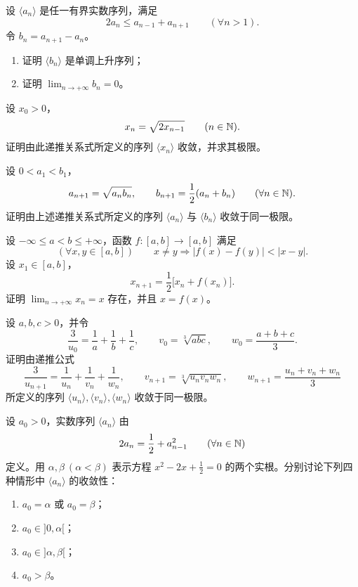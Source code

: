 \begin{exercise}
\item 设 \(\langle a_n\rangle\) 是任一有界实数序列，满足
\[
2a_n\leqslant a_{n-1}+a_{n+1}\qquad(\forall n>1).
\]
令 \(b_n=a_{n+1}-a_n\)。
\begin{enumerate}[label=\arabic*)]
  \item 证明 \(\langle b_n\rangle\) 是单调上升序列；
  \item 证明 \(\lim_{n\to+\infty}b_n=0\)。
\end{enumerate}
\end{exercise}

\begin{exercise}
\item 设 \(x_0>0\)，
\[
x_n=\sqrt{2x_{n-1}}\qquad(n\in\mathbb{N}).
\]
证明由此递推关系式所定义的序列 \(\langle x_n\rangle\) 收敛，并求其极限。
\end{exercise}

\begin{exercise}
\item 设 \(0<a_1<b_1\)，
\[
a_{n+1}=\sqrt{a_nb_n},\qquad
b_{n+1}=\frac12(a_n+b_n)\qquad(\forall n\in\mathbb{N}).
\]
证明由上述递推关系式所定义的序列 \(\langle a_n\rangle\) 与
\(\langle b_n\rangle\) 收敛于同一极限。
\end{exercise}

\begin{exercise}
\item 设 \(-\infty\leqslant a<b\leqslant+\infty\)，函数
\(f:[a,b]\to[a,b]\) 满足
\[
(\forall x,y\in[a,b])\qquad x\ne y\Longrightarrow
|f(x)-f(y)|<|x-y|.
\]
设 \(x_1\in[a,b]\)，
\[
x_{n+1}=\frac12\bigl[x_n+f(x_n)\bigr].
\]
证明 \(\lim_{n\to+\infty}x_n=x\) 存在，并且 \(x=f(x)\)。
\end{exercise}

\begin{exercise}
\item 设 \(a,b,c>0\)，并令
\[
\frac3{u_0}=\frac1a+\frac1b+\frac1c,\qquad
v_0=\sqrt[3]{abc},\qquad w_0=\frac{a+b+c}{3}.
\]
证明由递推公式
\[
\frac3{u_{n+1}}=\frac1{u_n}+\frac1{v_n}+\frac1{w_n},\qquad
v_{n+1}=\sqrt[3]{u_nv_nw_n},\qquad
w_{n+1}=\frac{u_n+v_n+w_n}{3}
\]
所定义的序列 \(\langle u_n\rangle,\langle v_n\rangle,\langle w_n\rangle\)
收敛于同一极限。
\end{exercise}

\begin{exercise}
\item 设 \(a_0>0\)，实数序列 \(\langle a_n\rangle\) 由
\[
2a_n=\frac12+a_{n-1}^2\qquad(\forall n\in\mathbb{N})
\]
定义。用 \(\alpha,\beta\ (\alpha<\beta)\) 表示方程
\(x^2-2x+\frac12=0\) 的两个实根。分别讨论下列四种情形中
\(\langle a_n\rangle\) 的收敛性：
\begin{enumerate}[label=\arabic*)]
  \item \(a_0=\alpha\) 或 \(a_0=\beta\)；
  \item \(a_0\in]0,\alpha[\)；
  \item \(a_0\in]\alpha,\beta[\)；
  \item \(a_0>\beta\)。
\end{enumerate}
\end{exercise}

